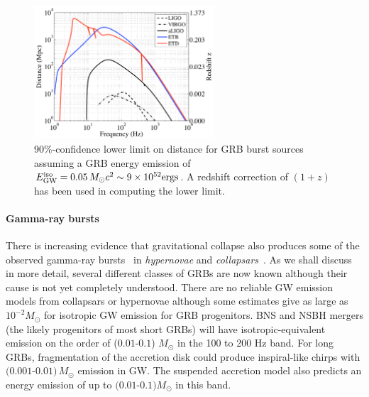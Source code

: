 \begin{figure}
\begin{center}
\includegraphics[width=0.60\textwidth]{./Sec_ET_ScienceCase/GWB_distance.pdf}
\caption{90\%-confidence lower limit on distance for GRB burst sources assuming 
a GRB energy emission of $E^{\rm iso}_{\rm GW} = 0.05\,M_{\odot} c^2 \sim 9 \times 10^{52} 
{\rm ergs}$. A redshift correction of $(1+z)$ has been used in computing the lower limit.
\label{fig:distanceFreq_5percentMsol}}
\end{center}
\end{figure}

\paragraph{Gamma-ray bursts}
There is increasing evidence that gravitational collapse also produces
some of the observed gamma-ray bursts~\cite{Hjorth2003} 
in \emph{hypernovae} and \emph{collapsars}~\cite{Woosley1993, MacFadyenWoosley1999}.
As we shall discuss in more detail, several different classes of GRBs are now known
although their cause is not yet completely understood. There are no
reliable GW emission models from collapsars or hypernovae although some 
estimates give as large as $10^{-2}M_\odot$ for isotropic GW emission for
GRB progenitors.  BNS and NSBH mergers (the likely progenitors of 
most short GRBs) will have isotropic-equivalent emission on the order 
of ($0.01$-$0.1$) $M_\odot$ in the 100 to 200 Hz band. For long GRBs, 
fragmentation of the accretion disk \cite{davies:2002,king:2005,piro:07}
could produce inspiral-like chirps with $(0.001$-$0.01)\,M_\odot$ emission 
in GW.  The suspended accretion model \cite{vanPutten:grb} also
predicts an energy emission of up to $(0.01$-$0.1) M_\odot$ in this
band.


